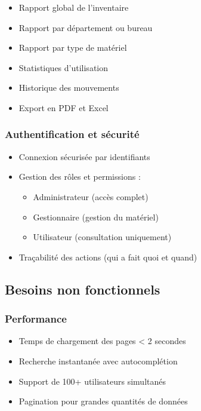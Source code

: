\documentclass[12pt,a4paper]{report}
\begin{document}
\begin{itemize}
    \item Rapport global de l'inventaire
    \item Rapport par département ou bureau
    \item Rapport par type de matériel
    \item Statistiques d'utilisation
    \item Historique des mouvements
    \item Export en PDF et Excel
\end{itemize}

\subsubsection{Authentification et sécurité}

\begin{itemize}
    \item Connexion sécurisée par identifiants
    \item Gestion des rôles et permissions :
    \begin{itemize}
        \item Administrateur (accès complet)
        \item Gestionnaire (gestion du matériel)
        \item Utilisateur (consultation uniquement)
    \end{itemize}
    \item Traçabilité des actions (qui a fait quoi et quand)
\end{itemize}

\subsection{Besoins non fonctionnels}

\subsubsection{Performance}

\begin{itemize}
    \item Temps de chargement des pages < 2 secondes
    \item Recherche instantanée avec autocomplétion
    \item Support de 100+ utilisateurs simultanés
    \item Pagination pour grandes quantités de données
\end{itemize}
\end{document}
